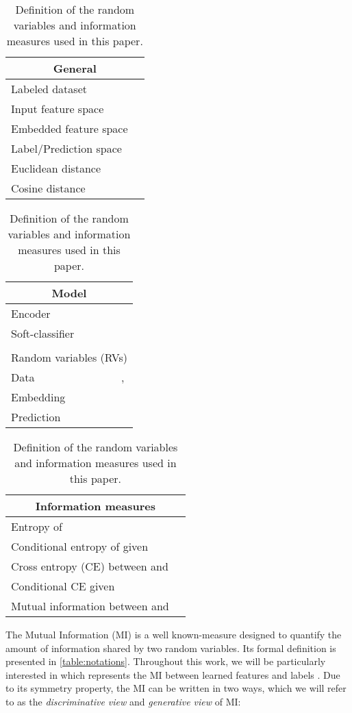 \documentclass[runningheads]{llncs}
\begin{document}
\begin{table}
    \caption{Definition of the random variables and information measures used in this paper.}
    \label{table:notations}
    \centering
    \begin{tabular}{lc}
    \multicolumn{2}{c}{General} \\
    \toprule
    Labeled dataset &  \\
    \midrule
    Input feature space &  \\
    \midrule
    Embedded feature space &  \\
    \midrule
    Label/Prediction space &  \\
    \midrule
    Euclidean distance &  \\
    \midrule
    Cosine distance &  \\
    \bottomrule
    \end{tabular}
    \qquad
    \begin{tabular}{lc}
    \multicolumn{2}{c}{Model} \\
    \toprule
    Encoder &  \\
    \midrule
    Soft-classifier &  \\
    \bottomrule \\
    \multicolumn{2}{c}{Random variables (RVs)} \\
    \toprule
    Data &  ,  \\
    \midrule
    Embedding &   \\
    \midrule 
    Prediction &   \\
    \bottomrule
    \end{tabular}
    \begin{tabular}{lc}
    \multicolumn{2}{c}{\rule{0pt}{4ex}Information measures} \\
    \toprule
    Entropy of  &  \\
    \midrule
    Conditional entropy of  given   &  \\
    \midrule
    Cross entropy (CE) between  and   &  \\
    \midrule
    Conditional CE given   &  \\
    \midrule
    Mutual information between  and  &   \\
    \bottomrule
    \end{tabular}
\end{table}


The Mutual Information (MI) is a well known-measure designed to quantify the amount of information shared by two random variables. Its formal definition is presented in \autoref{table:notations}. Throughout this work, we will be particularly interested in  which represents the MI between learned 
features  and labels . 
Due to its symmetry property, the MI can be written in two ways, which we will refer to as the \textit{discriminative view} and \textit{generative view} of MI:
\end{document}

